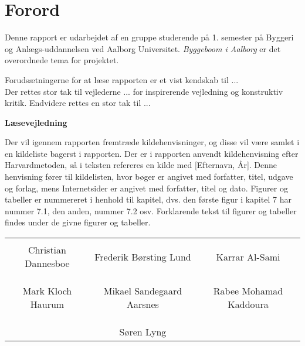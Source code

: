 \chapter*{Forord}

Denne rapport er udarbejdet af en gruppe studerende på 1. semester på Byggeri og Anlægs-uddannelsen ved Aalborg Universitet. \textit{Byggeboom i Aalborg} er det overordnede tema for projektet.

Forudsætningerne for at læse rapporten er et vist kendskab til ... \\
Der rettes stor tak til vejlederne ... for inspirerende vejledning og konstruktiv kritik. Endvidere rettes en stor tak til ...

\textbf{Læsevejledning}

Der vil igennem rapporten fremtræde kildehenvisninger, og disse vil være samlet i en kildeliste bagerst i rapporten. Der er i rapporten anvendt kildehenvisning efter Harvardmetoden, så i teksten refereres en kilde med [Efternavn, År]. Denne henvisning fører til kildelisten, hvor bøger er angivet med forfatter, titel, udgave og forlag, mens Internetsider er angivet med forfatter, titel og dato. Figurer og tabeller er nummereret i henhold til kapitel, dvs. den første figur i kapitel 7 har nummer 7.1, den anden, nummer 7.2 osv. Forklarende tekst til figurer og tabeller findes under de givne figurer og tabeller.

\phantom{Luft}

\phantom{Luft}

\begin{table}[H]
	\centering
		\begin{tabular}{c c c}
			\underline{\phantom{mmmmmmmmmmmmmm}} & \underline{\phantom{mmmmmmmmmmmmmm}} & \underline{\phantom{mmmmmmmmmmmmmm}} \\
			Christian Dannesboe			& Frederik Børsting Lund 		& Karrar Al-Sami 			\\
			&&\\
			&&\\
			\underline{\phantom{mmmmmmmmmmmmmm}} & \underline{\phantom{mmmmmmmmmmmmmm}} & \underline{\phantom{mmmmmmmmmmmmmm}} \\
			Mark Kloch Haurum			& Mikael Sandegaard Aarsnes 		& Rabee Mohamad Kaddoura 				\\
			&&\\
			&&\\
		 							& \underline{\phantom{mmmmmmmmmmmmmm}} 	&			\\														
									& Søren Lyng 							& 												
		\end{tabular}
\end{table}